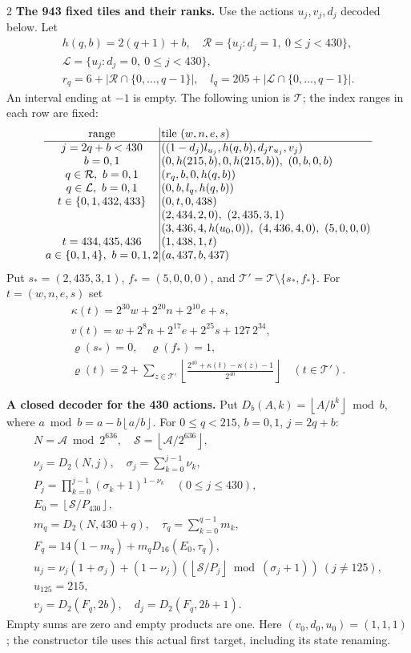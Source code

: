 \documentclass[10pt]{article}
\newcommand{\fl}[1]{\left\lfloor#1\right\rfloor}
\newcommand{\rg}[2]{\{#1,\ldots,#2\}}
\begin{document}
\begin{multicols}{2}
\textbf{The 943 fixed tiles and their ranks.}
Use the actions $u_j,v_j,d_j$ decoded below. Let
\[
\begin{gathered}
h(q,b)=2(q+1)+b,\quad
\mathcal R=\{u_j:d_j=1,\ 0\le j<430\},\\
\mathcal L=\{u_j:d_j=0,\ 0\le j<430\},\\
r_q=6+|\mathcal R\cap\rg0{q-1}|,\quad
l_q=205+|\mathcal L\cap\rg0{q-1}|.
\end{gathered}
\]
An interval ending at $-1$ is empty. The following union is $\mathcal T$;
the index ranges in each row are fixed:
\[
\setlength{\arraycolsep}{1.4pt}\begin{array}{c|l}
\text{range}&\text{tile }(w,n,e,s)\\\hline
j=2q+b<430&((1-d_j)l_{u_j},h(q,b),d_jr_{u_j},v_j)\\
b=0,1&(0,h(215,b),0,h(215,b)),\ (0,b,0,b)\\
q\in\mathcal R,\ b=0,1&(r_q,b,0,h(q,b))\\
q\in\mathcal L,\ b=0,1&(0,b,l_q,h(q,b))\\
t\in\{0,1,432,433\}&(0,t,0,438)\\
&(2,434,2,0),\ (2,435,3,1)\\
&(3,436,4,h(u_0,0)),\ (4,436,4,0),\ (5,0,0,0)\\
t=434,435,436&(1,438,1,t)\\
a\in\{0,1,4\},\ b=0,1,2&(a,437,b,437)
\end{array}
\]
Put $s_*=(2,435,3,1)$, $f_*=(5,0,0,0)$, and $\mathcal T'=\mathcal T\setminus\{s_*,f_*\}$.
For $t=(w,n,e,s)$ set
\[
\begin{gathered}
\kappa(t)=2^{30}w+2^{20}n+2^{10}e+s,\\
v(t)=w+2^8n+2^{17}e+2^{25}s+127\,2^{34},\\
\varrho(s_*)=0,\quad\varrho(f_*)=1,\\
\varrho(t)=2+\sum_{z\in\mathcal T'}
 \fl{\frac{2^{40}+\kappa(t)-\kappa(z)-1}{2^{40}}}
 \quad(t\in\mathcal T').
\end{gathered}
\]

\textbf{A closed decoder for the 430 actions.}
Put $D_b(A,k)=\fl{A/b^k}\bmod b$, where
$a\bmod b=a-b\fl{a/b}$. For $0\le q<215$, $b=0,1$, $j=2q+b$:
\[
\begin{gathered}
N=\mathcal A\bmod2^{636},\quad \mathcal S=\fl{\mathcal A/2^{636}},\\
\nu_j=D_2(N,j),\quad \sigma_j=\sum_{k=0}^{j-1}\nu_k,\\
P_j=\prod_{k=0}^{j-1}(\sigma_k+1)^{1-\nu_k}\quad(0\le j\le430),\\
E_0=\fl{\mathcal S/P_{430}},\\
m_q=D_2(N,430+q),\quad \tau_q=\sum_{k=0}^{q-1}m_k,\\
F_q=14(1-m_q)+m_qD_{16}(E_0,\tau_q),\\
u_j=\nu_j(1+\sigma_j)+(1-\nu_j)(\fl{\mathcal S/P_j}\bmod(\sigma_j+1))\ (j\ne125),\\
u_{125}=215,\\
v_j=D_2(F_q,2b),\quad d_j=D_2(F_q,2b+1).
\end{gathered}
\]
Empty sums are zero and empty products are one. Here
$(v_0,d_0,u_0)=(1,1,1)$; the constructor tile
uses this actual first target, including its state renaming.


\end{multicols}
\end{document}

